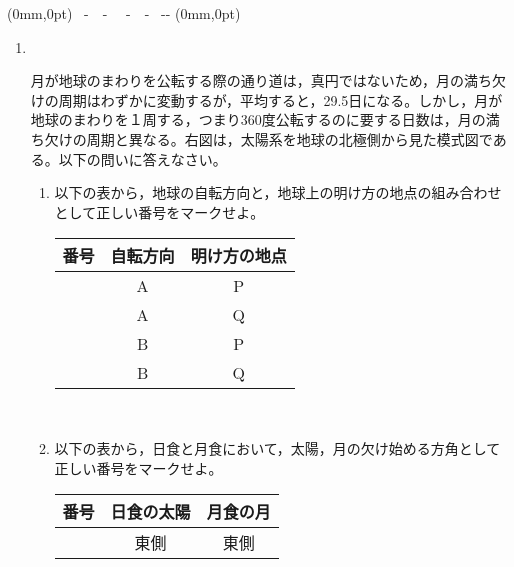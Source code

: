 \documentclass[b5j,10pt,dvipdfmx]{jsbook}
\begin{document}
\setcounter{page}{0}
%
{(0mm,0pt)%
{~\hfill -~\thepage ~- \hfill~}{~\hfill -~\thepage~- \hfill~}{\hfill-\pagemark -\hfill}%
(0mm,0pt)}
\hakosyokika
\pagestyle{empty}
    \begin{enumerate}
    \item ~~
        \begin{mawarikomi}{270pt}{}
            月が地球のまわりを公転する際の通り道は，真円ではないため，月の満ち欠けの周期はわずかに変動するが，平均すると，29.5日になる。しかし，月が地球のまわりを１周する，つまり360度公転するのに要する日数は，月の満ち欠けの周期と異なる。右図は，太陽系を地球の北極側から見た模式図である。以下の問いに答えなさい。
            \begin{enumerate}
                \item 以下の表から，地球の自転方向と，地球上の明け方の地点の組み合わせとして正しい番号をマークせよ。\\
                    \begin{tabularx}{250pt}{|C|C|C|}
                        \hline
                        {\sf 番号}  &  自転方向    &  明け方の地点 \\ \hline
                        {}    &  {\sf A}     &  {\sf P} \\ \hline
                        {}    &  {\sf A}     &  {\sf Q} \\ \hline
                        {}    &  {\sf B}     &  {\sf P} \\ \hline
                        {}    &  {\sf B}     &  {\sf Q} \\ \hline
                    \end{tabularx}
                    \\
                    \item 以下の表から，日食と月食において，太陽，月の欠け始める方角として正しい番号をマークせよ。\\
                    \begin{tabularx}{250pt}{|C|C|C|}
                        \hline
                        {\sf 番号}  &  日食の太陽    &  月食の月 \\ \hline
                        {}    &  東側     &  東側 \\ \hline

\end{tabularx}
\end{enumerate}
\end{mawarikomi}
\end{enumerate}
\end{document}

